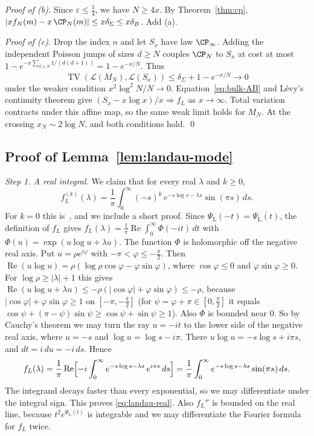 \emph{Proof of (b).} Since $\varepsilon\le\frac14$, we have $N\ge4x$. By Theorem~\ref{thm:cp},
$\lvert xf_N(m)-x\,\CP_N(m)\rvert\le x\delta_\Sigma\le x\delta_B$. Add (a).

\emph{Proof of (c).} Drop the index $n$ and let $S_x$ have law
$\CP_\infty$. Adding the independent Poisson jumps of sizes $d\ge N$
couples $\CP_N$ to $S_x$ at cost at most
$1-e^{-x\sum_{d\ge N}1/(d(d+1))}=1-e^{-x/N}$. Thus
\[
 \operatorname{TV}(\mathcal L(M_N),\mathcal L(S_x))
 \le\delta_\Sigma+1-e^{-x/N}\longrightarrow0
\]
under the weaker condition $x^2\log^2N/N\to0$.
Equation~\eqref{eq:bulk-AB} and L\'evy's continuity theorem give
$(S_x-x\log x)/x\Rightarrow f_L$ as $x\to\infty$.
Total variation contracts under this affine map, so the same weak limit
holds for $M_N$. At the crossing $x_N\sim2\log N$, and both conditions
hold. \qed

\subsection{Proof of Lemma~\ref{lem:landau-mode}}\label{app:bulk-mode}

\emph{Step 1. A real integral.} We claim that for every real $\lambda$ and
$k\ge0$,
\begin{equation}\label{eq:landau-real}
 f_L^{(k)}(\lambda)=\frac1\pi\int_0^\infty(-s)^k\,e^{-s\log s-\lambda s}\sin(\pi s)\,ds .
\end{equation}
For $k=0$ this is~\cite[Eq.~(4.3)]{mohle2005}, and we include a short proof.
Since $\Psi_{\mathrm L}(-t)=\overline{\Psi_{\mathrm L}(t)}$, the definition of $f_L$ gives
$f_L(\lambda)=\frac1\pi\operatorname{Re}\int_0^\infty\Phi(-it)\,dt$ with
$\Phi(u)=\exp(u\log u+\lambda u)$. The function $\Phi$ is holomorphic off the
negative real axis. Put $u=\rho e^{i\varphi}$ with
$-\pi<\varphi\le-\frac\pi2$. Then
$\operatorname{Re}(u\log u)=\rho(\log\rho\cos\varphi-\varphi\sin\varphi)$,
where $\cos\varphi\le0$ and $\varphi\sin\varphi\ge0$. For
$\log\rho\ge\lvert\lambda\rvert+1$ this gives
$\operatorname{Re}(u\log u+\lambda u)\le-\rho(\lvert\cos\varphi\rvert+\varphi\sin\varphi)\le-\rho$,
because $\lvert\cos\varphi\rvert+\varphi\sin\varphi\ge1$ on
$[-\pi,-\frac\pi2]$ (for $\psi=\varphi+\pi\in[0,\frac\pi2]$ it equals
$\cos\psi+(\pi-\psi)\sin\psi\ge\cos\psi+\sin\psi\ge1$). Also $\Phi$ is bounded
near $0$. So by Cauchy's theorem we may turn the ray $u=-it$ to the lower
side of the negative real axis, where $u=-s$ and $\log u=\log s-i\pi$. There
$u\log u=-s\log s+i\pi s$, and $dt=i\,du=-i\,ds$. Hence
\[
 f_L(\lambda)=\frac1\pi\operatorname{Re}\Bigl[-i\int_0^\infty
 e^{-s\log s-\lambda s}\,e^{i\pi s}\,ds\Bigr]
 =\frac1\pi\int_0^\infty e^{-s\log s-\lambda s}\sin(\pi s)\,ds .
\]
The integrand decays faster than every exponential, so we may differentiate
under the integral sign. This proves \eqref{eq:landau-real}. Also $f_L''$
is bounded on the real line, because $t^2e^{\Psi_{\mathrm L}(t)}$ is integrable and we may
differentiate the Fourier formula for $f_L$ twice.

